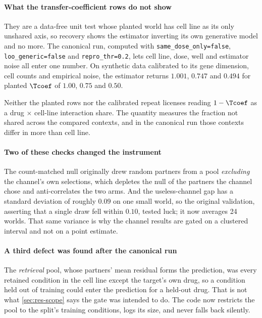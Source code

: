 \paragraph{What the transfer-coefficient rows do not show} They are a data-free
unit test whose planted world has cell line as its only unshared axis, so
recovery shows the estimator inverting its own generative model and no more. The
canonical run, computed with \texttt{same\_dose\_only=false},
\texttt{loo\_generic=false} and \texttt{repro\_thr=0.2}, lets cell line, dose,
well and estimator noise all enter one number. On synthetic data calibrated to
its gene dimension, cell counts and empirical noise, the estimator returns
$1.001$, $0.747$ and $0.494$ for planted $\Tcoef$ of $1.00$, $0.75$ and $0.50$.

\begin{scopelimit}
Neither the planted rows nor the calibrated repeat licenses reading
$1 - \Tcoef$ as a drug $\times$ cell-line interaction share. The quantity
measures the fraction not shared across the compared contexts, and in the
canonical run those contexts differ in more than cell line.
\end{scopelimit}

\paragraph{Two of these checks changed the instrument} The count-matched null
originally drew random partners from a pool \emph{excluding} the channel's own
selections, which depletes the null of the partners the channel chose and
anti-correlates the two arms. And the useless-channel gap has a standard
deviation of roughly $0.09$ on one small world, so the original validation,
asserting that a single draw fell within $0.10$, tested luck; it now averages 24
worlds. That same variance is why the channel results are gated on a clustered
interval and not on a point estimate.

\paragraph{A third defect was found after the canonical run} The \emph{retrieval}
pool, whose partners' mean residual forms the prediction, was every retained
condition in the cell line except the target's own drug, so a condition held out
of training could enter the prediction for a held-out drug. That is not what
\cref{sec:res-scope} says the gate was intended to do. The code now restricts
the pool to the split's training conditions, logs its size, and never falls back
silently.

